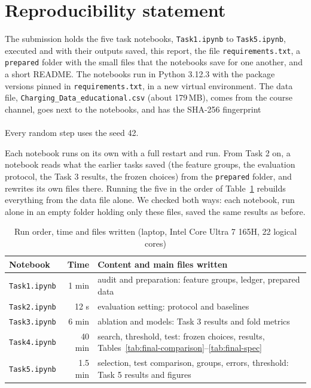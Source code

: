\documentclass[12pt,a4paper,openany]{report}
\begin{document}
\section{Reproducibility statement}\label{sec:final-repro}

The submission holds the five task notebooks, \nolinkurl{Task1.ipynb} to \nolinkurl{Task5.ipynb}, executed and with
their outputs saved, this report, the file \nolinkurl{requirements.txt}, a \nolinkurl{prepared} folder with the
small files that the notebooks save for one another, and a short README. The notebooks run in Python 3.12.3 with
the package versions pinned in \nolinkurl{requirements.txt}, in a new virtual environment. The data file,
\nolinkurl{Charging_Data_educational.csv} (about 179\,MB), comes from the course channel, goes next to the notebooks,
and has the SHA-256 fingerprint\\
\hspace*{\fill}\\
Every random step uses the seed 42.

Each notebook runs on its own with a full restart and run. From Task 2 on, a notebook reads what the earlier tasks
saved (the feature groups, the evaluation protocol, the Task 3 results, the frozen choices) from the
\nolinkurl{prepared} folder, and rewrites its own files there. Running the five in the order of
Table~\ref{tab:final-runs} rebuilds everything from the data file alone. We checked both ways: each notebook, run
alone in an empty folder holding only these files, saved the same results as before.

\begin{table}[!htb]
  \centering\small
  \caption{Run order, time and files written (laptop, Intel Core Ultra 7 165H, 22 logical cores)}
  \label{tab:final-runs}
  \begin{tabularx}{\textwidth}{@{}lr>{\raggedright\arraybackslash}X@{}}
    \toprule
    Notebook & Time & Content and main files written \\
    \midrule
    \nolinkurl{Task1.ipynb} & 1 min & audit and preparation: feature groups, ledger, prepared data \\
    \nolinkurl{Task2.ipynb} & 12 s & evaluation setting: protocol and baselines \\
    \nolinkurl{Task3.ipynb} & 6 min & ablation and models: Task 3 results and fold metrics \\
    \nolinkurl{Task4.ipynb} & 40 min & search, threshold, test: frozen choices, results, Tables~\ref{tab:final-comparison}--\ref{tab:final-spec} \\
    \nolinkurl{Task5.ipynb} & 1.5 min & selection, test comparison, groups, errors, threshold: Task 5 results and figures \\
    \bottomrule
  \end{tabularx}
\end{table}
\end{document}
